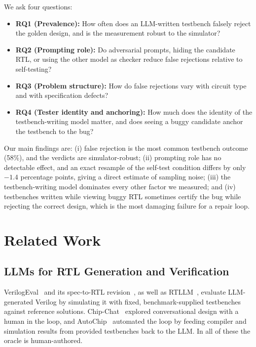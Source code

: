 \documentclass[conference]{IEEEtran}
\begin{document}
We ask four questions:
\begin{itemize}
    \item \textbf{RQ1 (Prevalence):} How often does an LLM-written testbench falsely reject the golden design, and is the measurement robust to the simulator?
    \item \textbf{RQ2 (Prompting role):} Do adversarial prompts, hiding the candidate RTL, or using the other model as checker reduce false rejections relative to self-testing?
    \item \textbf{RQ3 (Problem structure):} How do false rejections vary with circuit type and with specification defects?
    \item \textbf{RQ4 (Tester identity and anchoring):} How much does the identity of the testbench-writing model matter, and does seeing a buggy candidate anchor the testbench to the bug?
\end{itemize}

Our main findings are: (i) false rejection is the most common testbench outcome (58\%), and the verdicts are simulator-robust; (ii) prompting role has no detectable effect, and an exact resample of the self-test condition differs by only $-1.4$ percentage points, giving a direct estimate of sampling noise; (iii) the testbench-writing model dominates every other factor we measured; and (iv) testbenches written while viewing buggy RTL sometimes certify the bug while rejecting the correct design, which is the most damaging failure for a repair loop.

\section{Related Work}
\subsection{LLMs for RTL Generation and Verification}
VerilogEval~\cite{liu2023verilogeval} and its spec-to-RTL revision~\cite{pinckney2024revisiting}, as well as RTLLM~\cite{lu2024rtllm}, evaluate LLM-generated Verilog by simulating it with fixed, benchmark-supplied testbenches against reference solutions. Chip-Chat~\cite{blocklove2023chipchat} explored conversational design with a human in the loop, and AutoChip~\cite{thakur2023autochip} automated the loop by feeding compiler and simulation results from provided testbenches back to the LLM. In all of these the oracle is human-authored.
\end{document}
